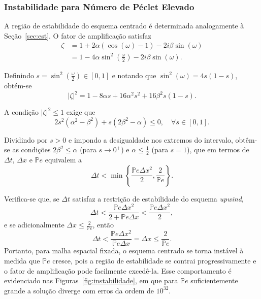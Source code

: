 \documentclass[12pt, a4paper]{article}
\newcommand{\bb}[1]{\mathbb{#1}}
\newcommand{\D}[1]{\Delta#1}
\newcommand{\Pe}{\bb{P}e}
\begin{document}
    \subsubsection{Instabilidade para Número de Péclet Elevado}\label{sec:inst}

    A região de estabilidade do esquema centrado é determinada analogamente à Seção~\ref{sec:est}. O fator de amplificação satisfaz
    \begin{equation}
        \begin{split}
            \zeta &= 1 + 2\alpha(\cos(\omega) - 1) - 2i\beta\sin(\omega) \\
                  &= 1 - 4\alpha\sin^2\left(\frac{\omega}{2}\right) - 2i\beta\sin(\omega).
        \end{split}
    \end{equation}

    Definindo $s = \sin^2\left( \frac{\omega}{2} \right) \in [0,1]$ e notando que $\sin^2(\omega) = 4s(1-s)$, obtém-se
    \begin{equation}
        |\zeta|^2 = 1-8\alpha s + 16\alpha^2 s^2 + 16\beta^2 s(1-s).
    \end{equation}

    A condição $|\zeta|^2 \leq 1$ exige que
    \begin{equation}
        2s^2 (\alpha^2 - \beta^2) + s(2\beta^2 - \alpha) \leq 0, \quad \forall s \in [0,1].
    \end{equation}

    Dividindo por $s > 0$ e impondo a desigualdade nos extremos do intervalo, obtêm-se as condições $2\beta^2 \leq \alpha$ (para $s \to 0^+$) e $\alpha \leq \frac{1}{2}$ (para $s = 1$), que em termos de $\D{t}$, $\D{x}$ e $\Pe$ equivalem a
    \begin{equation}
        \D{t} < \min\left\{\frac{\Pe\D{x^2}}{2}, \frac{2}{\Pe} \right\}.
    \end{equation}

    Verifica-se que, se $\D{t}$ satisfaz a restrição de estabilidade do esquema \textit{upwind},
    \[
        \Delta t < \frac{\Pe \D{x^2}}{2 + \Pe \D{x}} < \frac{\Pe \D{x^2}}{2},
    \]
    e se adicionalmente $\D{x} \leq \frac{2}{\Pe}$, então
    \[
        \D{t} < \frac{\Pe \D{x^2}}{\Pe \D{x}} = \D{x} \leq \frac{2}{\Pe}.
    \]
    Portanto, para malha espacial fixada, o esquema centrado se torna instável à medida que $\Pe$ cresce, pois a região de estabilidade se contrai progressivamente e o fator de amplificação pode facilmente excedê-la. Esse comportamento é evidenciado nas Figuras~\ref{fig:instabilidade}, em que para $\Pe$ suficientemente grande a solução diverge com erros da ordem de $10^{32}$.
\end{document}
